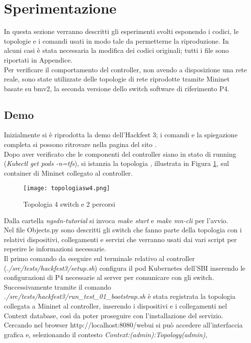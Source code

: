 \section{Sperimentazione}
In questa sezione verranno descritti gli esperimenti svolti esponendo i codici, le topologie e i comandi usati 
in modo tale da permetterne la riproduzione. In alcuni casi è stata necessaria la modifica dei codici originali; tutti i file sono riportati in Appendice.
\\Per verificare il comportamento del controller, non avendo a disposizione una rete reale, sono state utilizzate delle topologie
di rete riprodotte tramite Mininet basate su bmv2\cite{bmv2}, la seconda versione dello switch software di riferimento P4.
\subsection{Demo}
Inizialmente si è riprodotta la demo dell'Hackfest 3;
i comandi e la spiegazione completa si possono ritrovare nella pagina del sito \cite{hackfest}.
\\Dopo aver verificato che le componenti del controller siano in stato di running (\textit{Kubectl get pods -n=tfs}),
si istanzia la topologia \cite{topo4}, illustrata in Figura \ref{fig:top4}, sul container di Mininet collegato al controller.
\begin{figure}[h]
    \centering
    \texttt{[image: topologiasw4.png]}
    \caption{Topologia 4 switch e 2 percorsi}
    \label{fig:top4}
\end{figure}
Dalla cartella \textit{ngsdn-tutorial} si invoca \textit{make start} e \textit{make mn-cli} per l'avvio.
\\Nel file Objects.py sono descritti gli switch che fanno parte della topologia con i relativi
dispositivi, collegamenti e servizi che verranno usati dai vari script per reperire le informazioni necessarie.
\\Il primo comando da eseguire sul terminale relativo al controller (\textit{./src/tests/hackfest3/setup.sh}) configura il pod Kubernetes dell'SBI
inserendo le configurazioni di P4 necessarie al server per comunicare con gli switch.
\\Successivamente tramite il comando \textit{./src/tests/hackfest3/run\_test\_01\_bootstrap.sh} è stata registrata la topologia collegata a Mininet al controller,
inserendo i dispositivi e i collegamenti nel Context database, così da poter proseguire con l'installazione del servizio.
\\Cercando nel browser http://localhost:8080/webui si può accedere all'interfaccia grafica e, selezionando il contesto \textit{Context:(admin):Topology(admin)},
